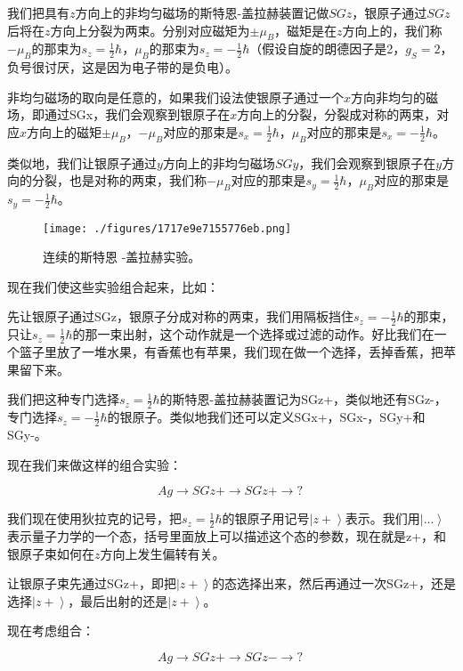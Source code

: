 我们把具有$z$方向上的非均匀磁场的斯特恩-盖拉赫装置记做$SGz$，银原子通过$SGz$后将在$z$方向上分裂为两束。分别对应磁矩为$\pm \mu_B$，磁矩是在$z$方向上的，我们称$- \mu_B$的那束为$s_z = \frac{1}{2}\hbar$，$\mu_B$的那束为$s_z = - \frac{1}{2}\hbar$（假设自旋的朗德因子是2，$g_S = 2$，负号很讨厌，这是因为电子带的是负电）。

非均匀磁场的取向是任意的，如果我们设法使银原子通过一个$x$方向非均匀的磁场，即通过SGx，我们会观察到银原子在$x$方向上的分裂，分裂成对称的两束，对应$x$方向上的磁矩$\pm \mu_B$，$- \mu_B $对应的那束是$s_x = \frac{1}{2} \hbar$，$\mu_B $对应的那束是$s_x = - \frac{1}{2} \hbar$。

类似地，我们让银原子通过$y$方向上的非均匀磁场$SGy$，我们会观察到银原子在$y$方向的分裂，也是对称的两束，我们称$- \mu_B$对应的那束是$s_y = \frac{1}{2} \hbar$，$\mu_B$对应的那束是$s_y = - \frac{1}{2} \hbar$。

\begin{figure}[ht]
\centering
\texttt{[image: ./figures/1717e9e7155776eb.png]}
\caption{连续的斯特恩 -盖拉赫实验。} \label{fig_QMPre2_23}
\end{figure}

现在我们使这些实验组合起来，比如：

先让银原子通过SGz，银原子分成对称的两束，我们用隔板挡住$s_z = -\frac{1}{2} \hbar$的那束，只让$s_z = \frac{1}{2} \hbar$的那一束出射，这个动作就是一个选择或过滤的动作。好比我们在一个篮子里放了一堆水果，有香蕉也有苹果，我们现在做一个选择，丢掉香蕉，把苹果留下来。

我们把这种专门选择$s_z = \frac{1}{2}\hbar$的斯特恩-盖拉赫装置记为SGz+，类似地还有SGz-，专门选择$s_z = - \frac{1}{2}\hbar$的银原子。类似地我们还可以定义SGx+，SGx-，SGy+和SGy-。

现在我们来做这样的组合实验：

\begin{equation}
Ag \to SGz+ \to SGz+ \to ?~
\end{equation}

我们现在使用狄拉克的记号，把$s_z = \frac{1}{2}\hbar$的银原子用记号$\left| z+ \right\rangle$表示。我们用$\left| { ... } \right\rangle$表示量子力学的一个态，括号里面放上可以描述这个态的参数，现在就是z+，和银原子束如何在$z$方向上发生偏转有关。

让银原子束先通过SGz+，即把$\left| z+ \right\rangle$的态选择出来，然后再通过一次SGz+，还是选择$\left| z+ \right\rangle$，最后出射的还是$\left| z+ \right\rangle$。

现在考虑组合：

\begin{equation}
Ag \to SGz+ \to SGz- \to ?~
\end{equation}

